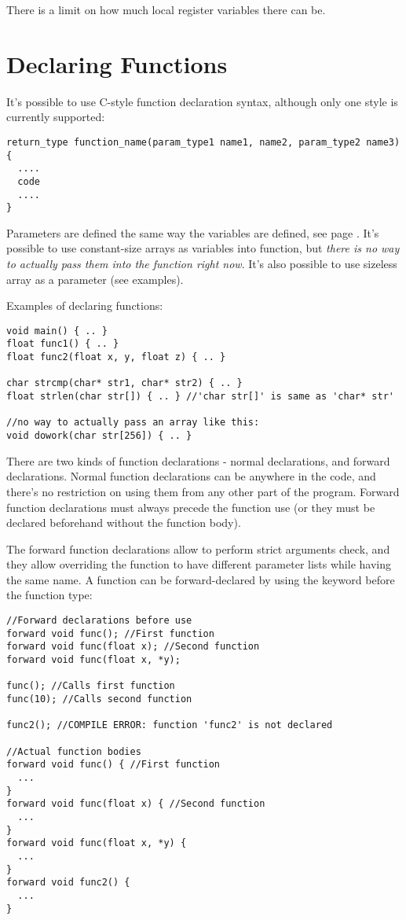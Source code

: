 There is a limit on how much local register variables there can be.


\section{Declaring Functions}
It's possible to use C-style function declaration syntax, although only one style is currently supported:
\begin{verbatim}
return_type function_name(param_type1 name1, name2, param_type2 name3) {
  ....
  code
  ....
}
\end{verbatim}

Parameters are defined the same way the variables are defined, see page \pageref{vardef}. It's possible to use constant-size arrays as variables into function, but \emph{there is no way to actually pass them into the function right now}. It's also possible to use sizeless array as a parameter (see examples).

Examples of declaring functions:
\begin{verbatim}
void main() { .. }
float func1() { .. }
float func2(float x, y, float z) { .. }

char strcmp(char* str1, char* str2) { .. }
float strlen(char str[]) { .. } //'char str[]' is same as 'char* str'

//no way to actually pass an array like this:
void dowork(char str[256]) { .. } 
\end{verbatim}

There are two kinds of function declarations - normal declarations, and forward declarations. Normal function declarations can be anywhere in the code, and there's no restriction on using them from any other part of the program. Forward function declarations must always precede the function use (or they must be declared beforehand without the function body).

The forward function declarations allow to perform strict arguments check, and they allow overriding the function to have different parameter lists while having the same name. A function can be forward-declared by using the  keyword before the function type:
\begin{verbatim}
//Forward declarations before use
forward void func(); //First function
forward void func(float x); //Second function
forward void func(float x, *y);

func(); //Calls first function
func(10); //Calls second function

func2(); //COMPILE ERROR: function 'func2' is not declared

//Actual function bodies
forward void func() { //First function
  ...
}
forward void func(float x) { //Second function
  ...
}
forward void func(float x, *y) {
  ...
}
forward void func2() {
  ...
}
\end{verbatim}

